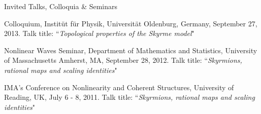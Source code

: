 \documentclass[10pt]{article} %
\begin{document}
\begin{section}{Invited Talks, Colloquia \& Seminars}
\begin{etaremune}
\item   Colloquium, Instit\"ut f\"ur Physik, Universit\"at Oldenburg, Germany, September 27, 2013. Talk title:
        ``\textit{Topological properties of the Skyrme model}"

\item   Nonlinear Waves Seminar, Department of Mathematics and Statistics, University of Massachusetts Amherst, MA, September 28, 2012.
        Talk title: ``\textit{Skyrmions, rational maps and scaling identities}"

\item   IMA's Conference on Nonlinearity and Coherent Structures, University of Reading, UK, July 6 - 8, 2011.
        Talk title: ``\textit{Skyrmions, rational maps and scaling identities}"

\end{etaremune}
\end{section}
\end{document}
